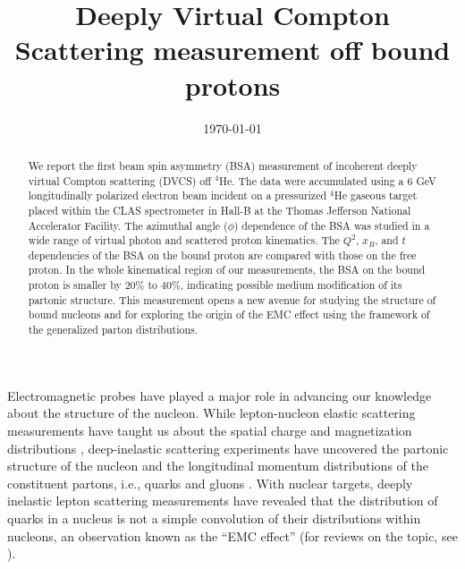 \documentclass[twocolumn,nofootinbib,showpacs,prl,superscriptaddress,secnumarabic,amssymb,nobibnotes,aps,floatfix]{revtex4}
\begin{document}
\linenumbers

\title{Deeply Virtual Compton Scattering measurement off bound protons}



\date{\today}
\begin{abstract}
 We report the first beam spin asymmetry (BSA) measurement of incoherent deeply 
   virtual Compton scattering (DVCS) off $^4$He. The data were accumulated 
   using a 6 GeV longitudinally polarized electron beam incident on a 
   pressurized $^4$He gaseous target placed within the CLAS spectrometer in 
   Hall-B at the Thomas Jefferson National Accelerator Facility. The azimuthal 
   angle ($\phi$) dependence of the BSA was studied in a wide range of virtual 
   photon and scattered proton kinematics. The $Q^2$, $x_B$, and $t$ 
   dependencies of the BSA on the bound proton are compared with those on the 
   free proton. In the whole kinematical region of our measurements, the BSA on 
   the bound proton is smaller by $20\%$ to $40\%$, indicating possible medium 
   modification of its partonic structure. This measurement opens a new avenue 
   for studying the structure of bound nucleons and for exploring the origin of 
   the EMC effect using the framework of the generalized parton distributions.

\end{abstract}

\maketitle 

Electromagnetic probes have played a major role in advancing our knowledge 
about the structure of the nucleon. While lepton-nucleon elastic scattering 
measurements have 
taught us about the spatial charge and magnetization distributions 
\cite{Hofstadter:1955ae,Perdrisat:2006hj}, deep-inelastic scattering 
experiments have uncovered the partonic structure of the nucleon and 
the longitudinal momentum distributions of the constituent partons, i.e., 
quarks and gluons \cite{pdg}.  With nuclear targets, deeply inelastic lepton 
scattering measurements have revealed that the distribution of quarks in a 
nucleus is not a simple convolution of their distributions within nucleons, an 
observation known as the ``EMC effect''\cite{EMC_first} (for reviews on the 
topic, see  \cite{Arneodo:1992wf,Geesaman:1995yd,Norton:2003cb,Hen:2016kwk}).
\end{document}
